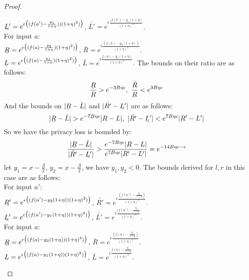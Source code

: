 \documentclass[a4paper,11pt]{article}
\begin{document}
\begin{proof}
\begin{itemize}
		$\ubar{L'} = e^{\epsilon 
				\big( (f(a') - \frac{y_1}{1 + \eta})) (1 + \eta)^2) \big)}$,
		$\bar{L'} = e^{\epsilon 
				\frac{(f(a') - y_1(1 + \eta)}{(1 + \eta)^2}}$.
		\\
		For input $a$:
		\\
		$\ubar{R} = e^{\epsilon 
				\big( (f(a) - \frac{y_2}{1 + \eta}) (1 + \eta)^2) \big)}$, 
		$\bar{R} = e^{\epsilon 
				\frac{(f(a) - y_2(1 + \eta))}{(1 + \eta)^2}}$.  
		\\
		$\ubar{L} = e^{\epsilon 
				\big( (f(a) - \frac{y_1}{1 + \eta}) (1 + \eta)^2) \big)}$, 
		$\bar{L} = e^{\epsilon 
				\frac{f(a) - y_1(1 + \eta)}{(1 + \eta)^2}}$.
		The bounds on their ratio are as follows:
		\[
		\frac{\ubar{R}}{R} > e^{-3B\eta \epsilon}, 
		~ \frac{\bar{R}}{R} < e^{3B\eta \epsilon}
		\]
		And the bounds on $|\ubar{R} - \bar{L}|$ and $|\bar{R'} - \ubar{L'}|$ are as follows:
		\[
		|\ubar{R} - \bar{L}| > e^{-7 B\eta \epsilon}|R - L|, 
		~ |\bar{R'} - \ubar{L'}| < e^{7 B\eta \epsilon}|R' - L'|
		\]
		So we have the privacy loss is bounded by:
		\[
		\frac{|\ubar{R} - \bar{L}|}{|\bar{R'} - \ubar{L'}|}
		> \frac{e^{-7 B\eta \epsilon}|R - L|}{e^{7 B\eta \epsilon}|R' - L'|}
		= e^{-14B \eta \epsilon - \epsilon}
		\]
		let $y_1 = x - \frac{\Lambda}{2}$, $y_2 = x - \frac{\Lambda}{2}$, we have $y_1, y_2 < 0$. The bounds derived for $l, r$ in this case are as follows:
		\\
		For input $a'$:
		\\
		$\ubar{R'} = e^{\epsilon 
				\big( (f(a') - y_2(1 + \eta)) (1 + \eta)^2) \big)}$, 
		$\bar{R'} = e^{\epsilon 
				\frac{(f(a') - \frac{y_2}{1 + \eta})}{(1 + \eta)^2}}$.
		\\
		$\ubar{L'} = e^{\epsilon 
				\big( (f(a') - y_1(1 + \eta) ) (1 + \eta)^2) \big)}$,
		$\bar{L'} = e^{\epsilon 
				\frac{(f(a') - \frac{y_1}{1 + \eta}}{(1 + \eta)^2}}$.
		\\
		For input $a$:
		\\
		$\ubar{R} = e^{\epsilon 
				\big( (f(a) - y_2(1 + \eta)) (1 + \eta)^2) \big)}$, 
		$\bar{R} = e^{\epsilon 
				\frac{(f(a) - \frac{y_2}{1 + \eta})}{(1 + \eta)^2}}$.  
		\\
		$\ubar{L} = e^{\epsilon 
				\big( (f(a) - y_1(1 + \eta)) (1 + \eta)^2) \big)}$, 
		$\bar{L} = e^{\epsilon 
				\frac{f(a) - \frac{y_1}{1 + \eta}}{(1 + \eta)^2}}$.

\end{itemize}
\end{proof}
\end{document}
